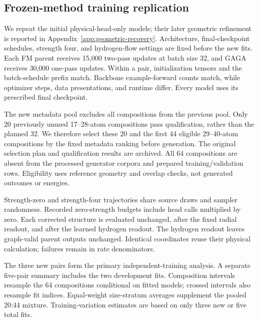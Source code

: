 \subsection{Frozen-method training replication}\label{app:seed-replication}
We repeat the initial physical-head-only models; their later geometric refinement is reported in Appendix~\ref{app:geometric-recovery}. Architecture, final-checkpoint schedules, strength four, and hydrogen-flow settings are fixed before the new fits. Each FM parent receives 15,000 two-pass updates at batch size 32, and GAGA receives 30,000 one-pass updates. Within a pair, initialization tensors and the batch-schedule prefix match. Backbone example-forward counts match, while optimizer steps, data presentations, and runtime differ. Every model uses its prescribed final checkpoint.

The new metadata pool excludes all compositions from the previous pool. Only 20 previously unused 17--28-atom compositions pass qualification, rather than the planned 32. We therefore select these 20 and the first 44 eligible 29--40-atom compositions by the fixed metadata ranking before generation. The original selection plan and qualification results are archived. All 64 compositions are absent from the processed generator corpora and prepared training/validation rows. Eligibility uses reference geometry and overlap checks, not generated outcomes or energies.

Strength-zero and strength-four trajectories share source draws and sampler randomness. Recorded zero-strength budgets include head calls multiplied by zero. Each corrected structure is evaluated unchanged, after the fixed radial readout, and after the learned hydrogen readout. The hydrogen readout leaves graph-valid parent outputs unchanged. Identical coordinates reuse their physical calculation; failures remain in rate denominators.

The three new pairs form the primary independent-training analysis. A separate five-pair summary includes the two development fits. Composition intervals resample the 64 compositions conditional on fitted models; crossed intervals also resample fit indices. Equal-weight size-stratum averages supplement the pooled 20:44 mixture. Training-variation estimates are based on only three new or five total fits.

